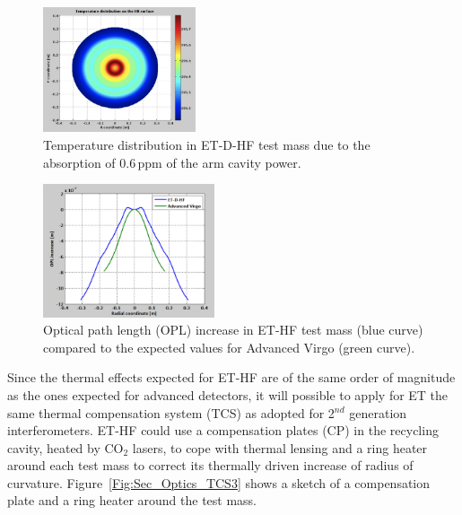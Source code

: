 \begin{figure}[!h]
\centering
\includegraphics[width=0.4\textwidth]{Sec_Optics/TCS_1b}
\caption{Temperature distribution in ET-D-HF test mass due to the absorption of 0.6\,ppm of the arm cavity power.}
\label{Fig:Sec_Optics_TCS1}   
\end{figure}


\begin{figure}[!h]
\centering
\includegraphics[width=0.45\textwidth]{Sec_Optics/TCS_2}
\caption{Optical path length (OPL) increase in ET-HF test mass (blue curve) compared to the expected values for Advanced Virgo (green curve).}
\label{Fig:Sec_Optics_TCS2}   
\end{figure}


Since the thermal effects expected for ET-HF are  of the same order of magnitude as the ones expected for advanced detectors,
it will possible to apply for ET the same thermal compensation system (TCS) as adopted for 2$^{nd}$ generation
  interferometers. ET-HF could use a compensation plates (CP) in the recycling cavity, heated by CO$_2$ lasers,
   to cope with thermal lensing and a ring heater around each test mass to correct its thermally driven increase of radius of 
   curvature. Figure~\ref{Fig:Sec_Optics_TCS3} shows a sketch of a compensation plate  and a ring heater  around the test mass. 

